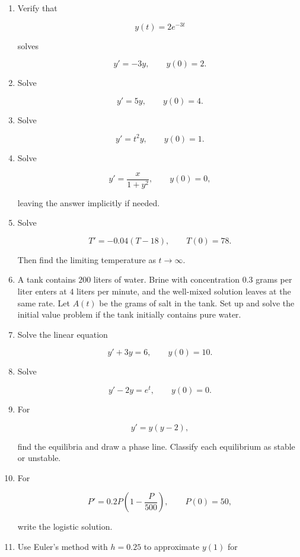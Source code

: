 \begin{enumerate}
\item Verify that

\[
y(t)=2e^{-3t}
\]

solves

\[
y'=-3y,
\qquad
y(0)=2.
\]

\item Solve

\[
y'=5y,
\qquad
y(0)=4.
\]

\item Solve

\[
y'=t^2y,
\qquad
y(0)=1.
\]

\item Solve

\[
y'=\frac{x}{1+y^2},
\qquad
y(0)=0,
\]

leaving the answer implicitly if needed.

\item Solve

\[
T'=-0.04(T-18),
\qquad
T(0)=78.
\]

Then find the limiting temperature as \(t\to\infty\).

\item A tank contains \(200\) liters of water.  Brine with concentration \(0.3\) grams per
liter enters at \(4\) liters per minute, and the well-mixed solution leaves at the same
rate.  Let \(A(t)\) be the grams of salt in the tank.  Set up and solve the initial value
problem if the tank initially contains pure water.

\item Solve the linear equation

\[
y'+3y=6,
\qquad
y(0)=10.
\]

\item Solve

\[
y'-2y=e^t,
\qquad
y(0)=0.
\]

\item For

\[
y'=y(y-2),
\]

find the equilibria and draw a phase line.  Classify each equilibrium as stable or
unstable.

\item For

\[
P'=0.2P\left(1-\frac{P}{500}\right),
\qquad
P(0)=50,
\]

write the logistic solution.

\item Use Euler's method with \(h=0.25\) to approximate \(y(1)\) for


\end{enumerate}
